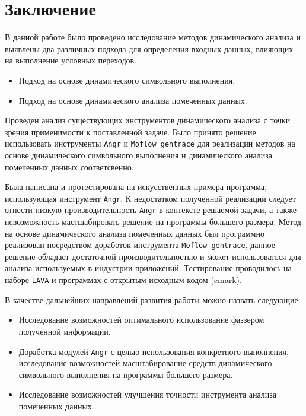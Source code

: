 \chapter*{Заключение}

В данной работе было проведено исследование методов динамического анализа и выявлены два различных подхода для определения входных данных, влияющих на выполнение условных переходов.

\begin{itemize}
    \item Подход на основе динамического символьного выполнения.
    \item Подход на основе динамического анализа помеченных данных.
\end{itemize}

Проведен анализ существующих инструментов динамического анализа с точки зрения применимости к поставленной задаче. Было принято решение использовать инструменты \texttt{Angr} и \texttt{Moflow gentrace} для реализации методов на основе динамического символьного выполнения и динамического анализа помеченных данных соответсвенно.

Была написана и протестирована на искусственных примера программа, использующая инструмент \texttt{Angr}. К недостатком полученной реализации следует отнести низкую производительность \texttt{Angr} в контексте решаемой задачи, а также невозможность мастшабировать решение на программы большего размера.
Метод на основе динамического анализа помеченных данных был программно реализован посредством доработок инструмента \texttt{Moflow gentrace}, данное решение обладает достаточной производительностью и может использоваться для анализа используемых в индустрии приложений. Тестирование проводилось на наборе \texttt{LAVA} и программах с открытым исходным кодом (cmark).


В качестве дальнейших направлений развития работы можно назвать следующие:

\begin{itemize}
    \item Исследование возможностей оптимального использование фаззером полученной информации.
    \item Доработка модулей \texttt{Angr} с целью использования конкретного выполнения, исследование возможностей масштабирование средств динамического символьного выполнения на программы большего размера.
    \item Исследование возможностей улучшения точности инструмента анализа помеченных данных.
\end{itemize}


